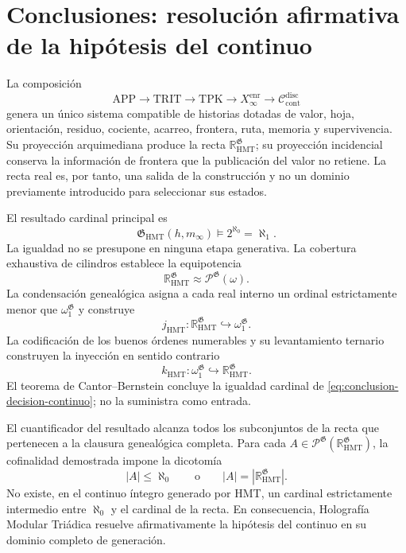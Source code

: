 \section{Conclusiones: resolución afirmativa de la hipótesis del continuo}
\label{sec:conclusiones-ch}
\begingroup
\fontsize{9.7}{11.8}\selectfont
\setlength{\parskip}{1.5pt}
\setlength{\abovedisplayskip}{4pt}
\setlength{\belowdisplayskip}{4pt}

La composición
\[
 \mathrm{APP}\longrightarrow\mathrm{TRIT}\longrightarrow\mathrm{TPK}
 \longrightarrow X_\infty^{\mathrm{enr}}
 \longrightarrow\mathcal C_{\mathrm{cont}}^{\mathrm{disc}}
\]
genera un único sistema compatible de historias dotadas de valor, hoja,
orientación, residuo, cociente, acarreo, frontera, ruta, memoria y
supervivencia. Su proyección arquimediana produce la recta
\(\mathbb R_{\mathrm{HMT}}^{\mathfrak G}\); su proyección incidencial conserva
la información de frontera que la publicación del valor no retiene. La recta
real es, por tanto, una salida de la construcción y no un dominio previamente
introducido para seleccionar sus estados.

El resultado cardinal principal es
\begin{equation}
 \boxed{
 \mathfrak G_{\mathrm{HMT}}(h,m_\infty)
 \models 2^{\aleph_0}=\aleph_1 .}
 \label{eq:conclusion-decision-continuo}
\end{equation}
La igualdad no se presupone en ninguna etapa generativa. La cobertura
exhaustiva de cilindros establece la equipotencia
\[
 \mathbb R_{\mathrm{HMT}}^{\mathfrak G}
 \approx\mathcal P^{\mathfrak G}(\omega).
\]
La condensación genealógica asigna a cada real interno un ordinal estrictamente
menor que \(\omega_1^{\mathfrak G}\) y construye
\[
 j_{\mathrm{HMT}}:
 \mathbb R_{\mathrm{HMT}}^{\mathfrak G}\hookrightarrow
 \omega_1^{\mathfrak G}.
\]
La codificación de los buenos órdenes numerables y su levantamiento ternario
construyen la inyección en sentido contrario
\[
 k_{\mathrm{HMT}}:
 \omega_1^{\mathfrak G}\hookrightarrow
 \mathbb R_{\mathrm{HMT}}^{\mathfrak G}.
\]
El teorema de Cantor--Bernstein concluye la igualdad cardinal de
\eqref{eq:conclusion-decision-continuo}; no la suministra como entrada.

El cuantificador del resultado alcanza todos los subconjuntos de la recta que
pertenecen a la clausura genealógica completa. Para cada
\(A\in\mathcal P^{\mathfrak G}
(\mathbb R_{\mathrm{HMT}}^{\mathfrak G})\), la cofinalidad demostrada impone
la dicotomía
\[
 |A|\leq\aleph_0
 \qquad\text{o}\qquad
 |A|=|\mathbb R_{\mathrm{HMT}}^{\mathfrak G}|.
\]
No existe, en el continuo íntegro generado por HMT, un cardinal estrictamente
intermedio entre \(\aleph_0\) y el cardinal de la recta. En consecuencia,
Holografía Modular Triádica resuelve afirmativamente la hipótesis del
continuo en su dominio completo de generación.

